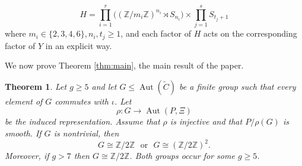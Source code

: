 \documentclass[10pt,a4paper]{amsart}
\newtheorem{thm}{Theorem}[section]
\numberwithin{equation}{section}
\newcommand{\ZZ}{\mathbb Z}
\DeclareMathOperator{\Aut}{Aut}
\begin{document}
\[
H=\prod_{i=1}^r\bigl(\left(\mathbb{Z} / m_i \mathbb{Z}\right)^{n_i} \rtimes S_{n_i}\bigr) \times \prod_{j=1}^s S_{t_j+1}
\]
where \(m_i \in\{2,3,4,6\}, n_i, t_j \geq 1\), and each factor of \(H\) acts on the corresponding factor of \(Y\) in an explicit way.

We now prove Theorem \ref{thm:main}, the main result of the paper.


\begin{thm}
\label{thm41}
Let $g\geq5$ and let $G\leq \Aut(\widetilde C)$ be a finite group such that every element of $G$ commutes with $\iota$. Let
$$\rho: G\longrightarrow \Aut(P,\Xi)$$
be the induced representation. Assume that $\rho$ is injective and that $P/\rho(G)$ is smooth. If $G$ is nontrivial, then $$G\cong \ZZ/2\ZZ \ \ \ \text{or}\ \ \ G\cong (\ZZ/2\ZZ)^2.$$
Moreover, if $g > 7$ then $G\cong \ZZ/2\ZZ$. 
Both groups occur for some $g \geq 5$.
\end{thm}
\end{document}
